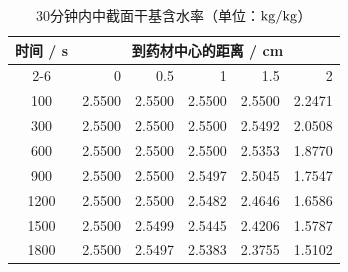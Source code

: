 \begin{table}[H]
\centering\small
\caption{30分钟内中截面干基含水率（单位：$\mathrm{kg/kg}$）}\label{tab:moisture}
\begin{tabular}{crrrrr}
\toprule
\multirow{2}{*}{时间 / s} & \multicolumn{5}{c}{到药材中心的距离 / cm}\\
\cmidrule(lr){2-6} & 0 & 0.5 & 1 & 1.5 & 2\\
\midrule
100 & 2.5500 & 2.5500 & 2.5500 & 2.5500 & 2.2471 \\
300 & 2.5500 & 2.5500 & 2.5500 & 2.5492 & 2.0508 \\
600 & 2.5500 & 2.5500 & 2.5500 & 2.5353 & 1.8770 \\
900 & 2.5500 & 2.5500 & 2.5497 & 2.5045 & 1.7547 \\
1200 & 2.5500 & 2.5500 & 2.5482 & 2.4646 & 1.6586 \\
1500 & 2.5500 & 2.5499 & 2.5445 & 2.4206 & 1.5787 \\
1800 & 2.5500 & 2.5497 & 2.5383 & 2.3755 & 1.5102 \\
\bottomrule
\end{tabular}
\end{table}
